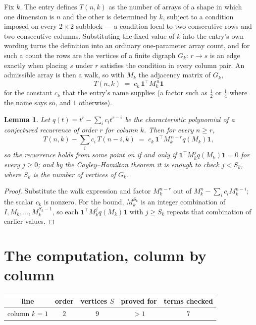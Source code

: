 \documentclass[11pt,a4paper]{article}
\theoremstyle{plain}
\newtheorem{lemma}[theorem]{Lemma}
\theoremstyle{definition}
\begin{document}
Fix $k$. The entry defines $T(n,k)$ as the number of arrays of a shape in which one dimension
is $n$ and the other is determined by $k$, subject to a condition imposed on every
$2\times2$ subblock --- a condition local to two consecutive rows and two consecutive columns.
Substituting the fixed value of $k$ into the entry's own wording turns the definition into an
ordinary one-parameter array count, and for such a count the rows are the vertices of a finite
digraph $G_k$: $r\to s$ is an edge exactly when placing $s$ under $r$ satisfies the condition
in every column pair. An admissible array is then a walk, so with $M_k$ the adjacency matrix
of $G_k$,
\[
T(n,k)\;=\;c_k\,\mathbf{1}^{\!\top}M_k^{\,n}\mathbf{1}
\]
for the constant $c_k$ that the entry's name supplies (a factor such as $\tfrac12$ or
$\tfrac14$ where the name says so, and $1$ otherwise).

\begin{lemma}\label{lem:crit}
Let $q(t)=t^{r}-\sum_i c_it^{r-i}$ be the characteristic polynomial of a conjectured
recurrence of order $r$ for column $k$. Then for every $n\ge r$,
\[
T(n,k)-\sum_i c_i\,T(n-i,k)\;=\;c_k\,\mathbf{1}^{\!\top}M_k^{\,n-r}q(M_k)\mathbf{1},
\]
so the recurrence holds from some point on if and only if
$\mathbf{1}^{\!\top}M_k^{j}q(M_k)\mathbf{1}=0$ for every $j\ge0$; and by the
Cayley--Hamilton theorem it is enough to check $j<S_k$, where $S_k$ is the number of vertices
of $G_k$.
\end{lemma}

\begin{proof}
Substitute the walk expression and factor $M_k^{n-r}$ out of $M_k^{n}-\sum_ic_iM_k^{n-i}$;
the scalar $c_k$ is nonzero. For the bound, $M_k^{S_k}$ is an integer combination of
$I,M_k,\dots,M_k^{S_k-1}$, so each $\mathbf{1}^{\!\top}M_k^{j}q(M_k)\mathbf{1}$ with
$j\ge S_k$ repeats that combination of earlier values.
\end{proof}

\section{The computation, column by column}

\begin{center}
\begin{tabular}{ccccc}
line & order & vertices $S$ & proved for & terms checked \\ \hline
column $k$$=1$ & $2$ & $9$ & $>1$ & $7$ \\
\end{tabular}
\end{center}
\end{document}
